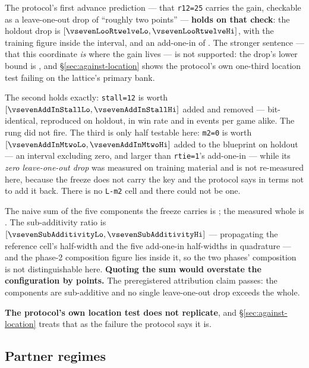 The protocol's first advance prediction --- that \texttt{r12=25} carries the gain, checkable as a
leave-one-out drop of ``roughly two points'' --- \textbf{holds on that check}: the holdout drop is
\vsevenLooRtwelve{} $[\vsevenLooRtwelveLo, \vsevenLooRtwelveHi]$, with the training figure
\vsevenTrainRtwelveLoo{} inside the interval, and an add-one-in of \vsevenAddInRtwelve{}. The
stronger sentence --- that this coordinate \emph{is} where the gain lives --- is not supported: the
drop's lower bound is \vsevenLooRtwelveLo{}, and \S\ref{sec:against-location} shows the
protocol's own one-third location test failing on the lattice's primary bank.

The second holds exactly: \texttt{stall=12} is worth \vsevenAddInStall{}
$[\vsevenAddInStallLo, \vsevenAddInStallHi]$ added and \vsevenLooStall{} removed --- bit-identical,
reproduced on holdout, in win rate and in events per game alike. The rung did not fire. The third is only half testable here: \texttt{m2=0} is worth \vsevenAddInMtwo{}
$[\vsevenAddInMtwoLo, \vsevenAddInMtwoHi]$ added to the blueprint on holdout --- an interval
excluding zero, and larger than \texttt{rtie=1}'s add-one-in --- while its \emph{zero leave-one-out
drop} was measured on training material and is not re-measured here, because the freeze does not
carry the key and the protocol says in terms not to add it back. There is no \texttt{L-m2} cell and
there could not be one.

The naive sum of the five components the freeze carries is \vsevenBfiveSum{}; the measured whole is
\vsevenBfiveWhole{}. The sub-additivity ratio is \vsevenSubAdditivity{}
$[\vsevenSubAdditivityLo, \vsevenSubAdditivityHi]$ --- propagating the reference cell's half-width
and the five add-one-in half-widths in quadrature --- and the phase-2 composition figure
\vsevenSubAddPhaseTwo{} lies inside it, so the two phases' composition is not distinguishable here. \textbf{Quoting the sum would overstate the configuration by
\vsevenSubAdditivityOverstate{} points.} The preregistered attribution claim passes: the components are
sub-additive and no single leave-one-out drop exceeds the whole.

\textbf{The protocol's own location test does not replicate}, and \S\ref{sec:against-location} treats
that as the failure the protocol says it is.

\subsection{Partner regimes}
\label{sec:results-partners}

